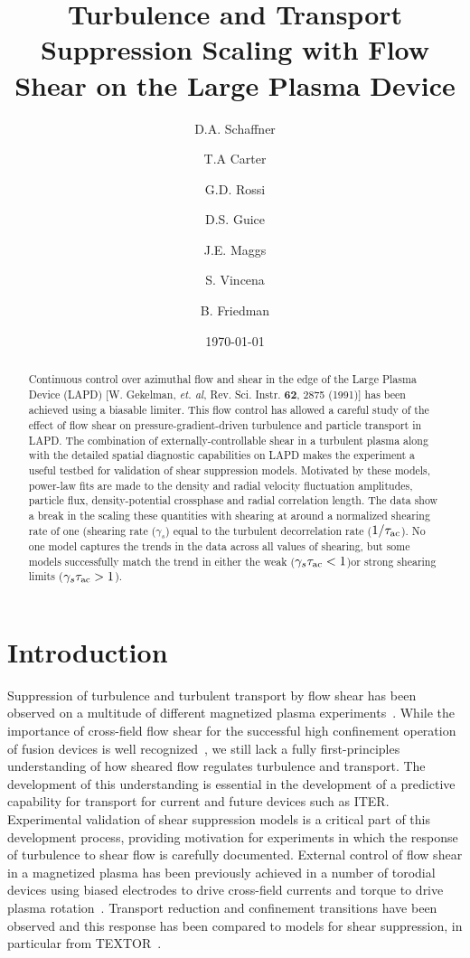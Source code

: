 \documentclass[aip,pop,amsmath,amssymb,preprint,superscriptaddress]{revtex4-1} %
\begin{document}
\title{Turbulence and Transport Suppression Scaling with Flow Shear on the Large Plasma Device}
\author{D.A. Schaffner}
\author{T.A Carter}
\author{G.D. Rossi}
\author{D.S. Guice}
\author{J.E. Maggs}
\author{S. Vincena}
\author{B. Friedman}
\date{\today}
\begin{abstract}
Continuous control over azimuthal flow and shear in the edge of the Large Plasma Device (LAPD) [W. Gekelman, \textit{et. al}, Rev. Sci. Instr. \textbf{62}, 2875 (1991)] has been achieved using a biasable limiter.  This flow control has allowed a careful study of the effect of flow shear on pressure-gradient-driven turbulence and particle transport in LAPD. The combination of externally-controllable shear in a turbulent plasma along with the detailed spatial diagnostic capabilities on LAPD makes the experiment a useful testbed for validation of shear suppression models. Motivated by these models, power-law fits are made to the density and radial velocity fluctuation amplitudes, particle flux, density-potential crossphase and radial correlation length.  The data show a break in the scaling these quantities with shearing at around a normalized shearing rate of one (shearing rate ($\gamma_s$) equal to the turbulent decorrelation rate ($1/\tau_{\rm ac}$).  No one model captures the trends in the data across all values of shearing, but some models successfully match the trend in either the weak  ($\gamma_s \tau_{\rm ac} < 1$)or strong shearing limits ($\gamma_s \tau_{\rm ac} > 1$). 
\end{abstract}
\maketitle

\section{Introduction}

Suppression of turbulence and turbulent transport by flow shear has been observed on a multitude of different magnetized plasma experiments~\cite{burrell97,burrell99,terry00,oost03,sakai93,schaffner12}. While the importance of cross-field flow shear for the successful high confinement operation of fusion devices is well recognized~\cite{burrel92}, we still lack a fully first-principles understanding of how sheared flow regulates turbulence and transport.  The development of this understanding is essential in the development of a predictive capability for transport for current and future devices such as ITER. Experimental validation of shear suppression models is a critical part of this development process, providing motivation for experiments in which the response of turbulence to shear flow is carefully documented.  External control of flow shear in a magnetized plasma has been previously achieved in a number of torodial devices using biased electrodes to drive cross-field currents and torque to drive plasma rotation~\cite{taylor89,weynants92}.   Transport reduction and confinement transitions have been observed and this response has been compared to models for shear suppression, in particular  from TEXTOR~\cite{weynants98,boedo00,boedo02}.
\end{document}

